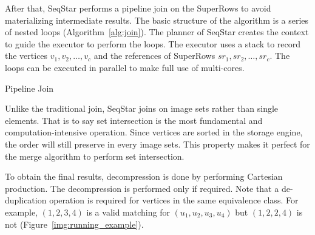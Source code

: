 After that, SeqStar performs a pipeline join on the SuperRows to avoid materializing intermediate results.
The basic structure of the algorithm is a series of nested loops (Algorithm~\ref{alg:join}).
The planner of SeqStar creates the context to guide the executor to perform the loops.
The executor uses a stack to record the vertices $v_1, v_2, \dots, v_c$ and the references of SuperRows $sr_1, sr_2, \dots, sr_c$.
The loops can be executed in parallel to make full use of multi-cores.

\begin{algorithm}[ht]
  \caption{Pipeline Join}\label{alg:join}
\end{algorithm}

Unlike the traditional join, SeqStar joins on image sets rather than single elements.
That is to say set intersection is the most fundamental and computation-intensive operation.
Since vertices are sorted in the storage engine,
the order will still preserve in every image sets.
This property makes it perfect for the merge algorithm to perform set intersection.

To obtain the final results, decompression is done by performing Cartesian production.
The decompression is performed only if required.
Note that a de-duplication operation is required for vertices in the same equivalence class.
For example, $(1, 2, 3, 4)$ is a valid matching for $(u_1, u_2, u_3, u_4)$ but $(1, 2, 2, 4)$ is not (Figure~\ref{img:running_example}).


